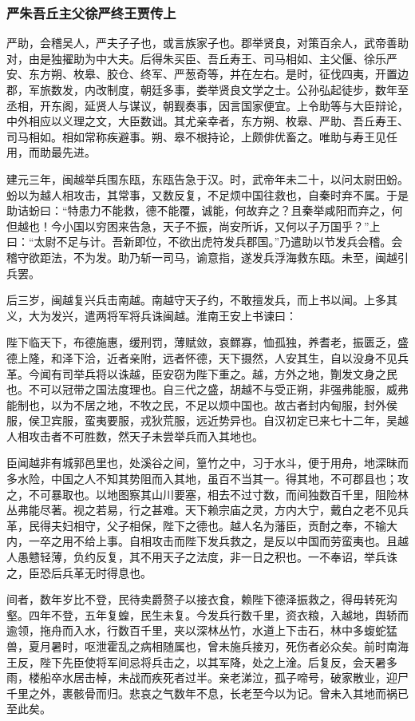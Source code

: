 \documentclass[]{article}
\begin{document}
\hypertarget{header-n4827}{%
\subsubsection{严朱吾丘主父徐严终王贾传上}\label{header-n4827}}

严助，会稽吴人，严夫子子也，或言族家子也。郡举贤良，对策百余人，武帝善助对，由是独擢助为中大夫。后得朱买臣、吾丘寿王、司马相如、主父偃、徐乐严安、东方朔、枚皋、胶仓、终军、严葱奇等，并在左右。是时，征伐四夷，开置边郡，军旅数发，内改制度，朝廷多事，娄举贤良文学之士。公孙弘起徒步，数年至丞相，开东阁，延贤人与谋议，朝觐奏事，因言国家便宜。上令助等与大臣辩论，中外相应以义理之文，大臣数诎。其尤亲幸者，东方朔、枚皋、严助、吾丘寿王、司马相如。相如常称疾避事。朔、皋不根持论，上颇俳优畜之。唯助与寿王见任用，而助最先进。

建元三年，闽越举兵围东瓯，东瓯告急于汉。时，武帝年未二十，以问太尉田蚡。蚡以为越人相攻击，其常事，又数反复，不足烦中国往救也，自秦时弃不属。于是助诘蚡曰：``特患力不能救，德不能覆，诚能，何故弃之？且秦举咸阳而弃之，何但越也！今小国以穷困来告急，天子不振，尚安所诉，又何以子万国乎？''上曰：``太尉不足与计。吾新即位，不欲出虎符发兵郡国。''乃遣助以节发兵会稽。会稽守欲距法，不为发。助乃斩一司马，谕意指，遂发兵浮海救东瓯。未至，闽越引兵罢。

后三岁，闽越复兴兵击南越。南越守天子约，不敢擅发兵，而上书以闻。上多其义，大为发兴，遣两将军将兵诛闽越。淮南王安上书谏曰：

陛下临天下，布德施惠，缓刑罚，薄赋敛，哀鳏寡，恤孤独，养耆老，振匮乏，盛德上隆，和泽下洽，近者亲附，远者怀德，天下摄然，人安其生，自以没身不见兵革。今闻有司举兵将以诛越，臣安窃为陛下重之。越，方外之地，劗发文身之民也。不可以冠带之国法度理也。自三代之盛，胡越不与受正朔，非强弗能服，威弗能制也，以为不居之地，不牧之民，不足以烦中国也。故古者封内甸服，封外侯服，侯卫宾服，蛮夷要服，戎狄荒服，远近势异也。自汉初定已来七十二年，吴越人相攻击者不可胜数，然天子未尝举兵而入其地也。

臣闻越非有城郭邑里也，处溪谷之间，篁竹之中，习于水斗，便于用舟，地深昧而多水险，中国之人不知其势阻而入其地，虽百不当其一。得其地，不可郡县也；攻之，不可暴取也。以地图察其山川要塞，相去不过寸数，而间独数百千里，阻险林丛弗能尽著。视之若易，行之甚难。天下赖宗庙之灵，方内大宁，戴白之老不见兵革，民得夫妇相守，父子相保，陛下之德也。越人名为藩臣，贡酎之奉，不输大内，一卒之用不给上事。自相攻击而陛下发兵救之，是反以中国而劳蛮夷也。且越人愚戆轻薄，负约反复，其不用天子之法度，非一日之积也。一不奉诏，举兵诛之，臣恐后兵革无时得息也。

间者，数年岁比不登，民待卖爵赘子以接衣食，赖陛下德泽振救之，得毋转死沟壑。四年不登，五年复蝗，民生未复。今发兵行数千里，资衣粮，入越地，舆轿而逾领，拖舟而入水，行数百千里，夹以深林丛竹，水道上下击石，林中多蝮蛇猛兽，夏月暑时，呕泄霍乱之病相随属也，曾未施兵接刃，死伤者必众矣。前时南海王反，陛下先臣使将军间忌将兵击之，以其军降，处之上淦。后复反，会天暑多雨，楼船卒水居击棹，未战而疾死者过半。亲老涕泣，孤子啼号，破家散业，迎尸千里之外，裹骸骨而归。悲哀之气数年不息，长老至今以为记。曾未入其地而祸已至此矣。
\end{document}

